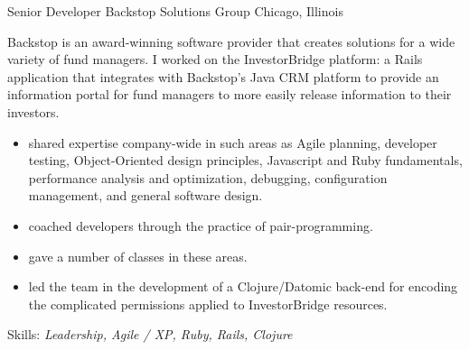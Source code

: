 \documentclass[11pt,letterpaper]{moderncv}
\begin{document}
 {Senior Developer} {Backstop Solutions Group} {Chicago, Illinois} {} {%
  Backstop is an award-winning software provider that creates solutions for a
  wide variety of fund managers.  I worked on the InvestorBridge platform: a
  Rails application that integrates with Backstop's Java CRM platform to
  provide an information portal for fund managers to more easily release
  information to their investors.
  \begin{itemize}
  \item shared expertise company-wide in such areas as Agile planning,
    developer testing, Object-Oriented design principles, Javascript
    and Ruby fundamentals, performance analysis and optimization,
    debugging, configuration management, and general software design.
  \item coached developers through the practice of pair-programming.
  \item gave a number of classes in these areas.
  \item led the team in the development of a Clojure/Datomic back-end for encoding the
    complicated permissions applied to InvestorBridge resources.
  \end{itemize}
  Skills: \emph{Leadership, Agile / XP, Ruby, Rails, Clojure}
}
\end{document}
